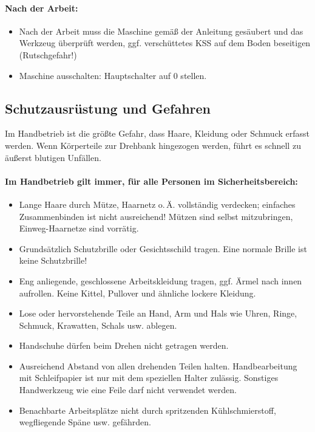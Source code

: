 \documentclass{\basedir/fablab-document}
\begin{document}
\paragraph{Nach der Arbeit:}
\begin{itemize}
 \item Nach der Arbeit muss die Maschine gemäß der Anleitung gesäubert und das Werkzeug überprüft werden, ggf. verschüttetes KSS auf dem Boden beseitigen (Rutschgefahr!)
 \item Maschine ausschalten: Hauptschalter auf 0 stellen.
\end{itemize}

\subsection{Schutzausrüstung und Gefahren}
Im Handbetrieb ist die größte Gefahr, dass Haare, Kleidung oder Schmuck erfasst werden. Wenn Körperteile zur Drehbank hingezogen werden, führt es schnell zu äußerst blutigen Unfällen.

\paragraph{Im Handbetrieb gilt immer, für alle Personen im Sicherheitsbereich:}
\begin{itemize}
 \item Lange Haare durch Mütze, Haarnetz o.\,Ä. vollständig verdecken; einfaches Zusammenbinden ist nicht ausreichend! Mützen sind selbst mitzubringen, Einweg-Haarnetze sind vorrätig.
 \item Grundsätzlich Schutzbrille oder Gesichtsschild tragen. Eine normale Brille ist keine Schutzbrille!
 \item Eng anliegende, geschlossene Arbeitskleidung tragen, ggf. Ärmel nach innen aufrollen. Keine Kittel, Pullover und ähnliche lockere Kleidung.
 \item Lose oder hervorstehende Teile an Hand, Arm und Hals wie Uhren, Ringe, Schmuck, Krawatten, Schals usw. ablegen.
 \item Handschuhe dürfen beim Drehen nicht getragen werden.
 \item Ausreichend Abstand von allen drehenden Teilen halten. Handbearbeitung mit Schleifpapier ist nur mit dem speziellen Halter zulässig. Sonstiges Handwerkzeug wie eine Feile darf nicht verwendet werden.
 \item Benachbarte Arbeitsplätze nicht durch spritzenden Kühlschmierstoff, wegfliegende Späne usw. gefährden.
\end{itemize}
\end{document}
